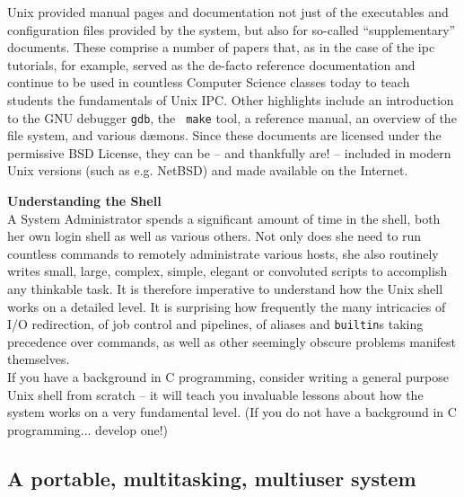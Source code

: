 Unix provided manual pages and documentation not just
of the executables and configuration files provided by
the system, but also for so-called ``supplementary''
documents.  These comprise a number of papers that,
as in the case of the \gls{ipc} tutorials,
for example, served as the de-facto reference
documentation and continue to be used in countless
Computer Science classes today to teach students the
fundamentals of Unix IPC.  Other highlights include an
introduction to the GNU debugger {\tt gdb}, the {\tt
make} tool, a  reference manual, an
overview of the file system, and various d\ae mons.
Since these documents are licensed under the
permissive  BSD License, they can
be -- and thankfully are! -- included in modern Unix
versions (such as e.g. NetBSD) and made
available on the Internet\cite{history:nbsd-docs}.

\begin{sidenote}
{\bf Understanding the Shell} \\
A System Administrator spends a significant amount of
time in the shell, both her own login shell as well as
various others.  Not only does she need to run
countless commands to remotely administrate various
hosts, she also routinely writes small, large,
complex, simple, elegant or convoluted scripts to
accomplish any thinkable task.  It is therefore
imperative to understand how the Unix shell works on a
detailed level.  It is surprising how frequently the
many intricacies of I/O redirection, of job control
and pipelines, of aliases and {\tt builtin}s taking
precedence over commands, as well as other seemingly
obscure problems manifest themselves. \\ [10pt]

If you have a background in C programming, consider
writing a general purpose Unix shell from scratch --
it will teach you invaluable lessons about how the
system works on a very fundamental level.  (If you do
not have a background in C programming... develop
one!)
\end{sidenote}



\subsection{A portable, multitasking, multiuser system}
\label{unix:basics:multi}

